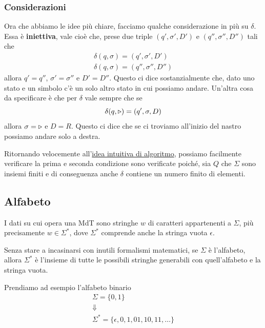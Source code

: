 \subsubsection{Considerazioni}
Ora che abbiamo le idee più chiare, facciamo qualche
considerazione in più su $\delta$. Essa è \textbf{iniettiva},
vale cioè che, prese due triple $(q', \sigma', D')$ e
$(q'', \sigma'', D'')$ tali che
\begin{gather*}
	\delta (q, \sigma) =  (q', \sigma', D') \\
	\delta (q, \sigma) = (q'', \sigma'', D'')
\end{gather*}
allora $q' = q''$, $\sigma' = \sigma''$ e $D' = D''$.
Questo ci dice sostanzialmente che, dato uno stato e un simbolo
c'è un solo altro stato in cui possiamo andare. Un'altra cosa
da specificare è che per $\delta$ vale sempre che se
\[ \delta(q, \triangleright) = (q', \sigma, D) \]
allora $\sigma = \triangleright$ e $D = R$. Questo ci dice che se ci
troviamo all'inizio del nastro possiamo andare solo a destra.

Ritornando velocemente
all'\hyperref[sec: algoritmo]{idea intuitiva di algoritmo},
possiamo facilmente verificare la prima e seconda condizione
sono verificate poiché, sia $Q$ che $\Sigma$ sono insiemi
finiti e di conseguenza anche $\delta$ contiene un numero
finito di elementi.

\subsection{Alfabeto}
I dati su cui opera una MdT sono stringhe $w$ di caratteri
appartenenti a $\Sigma$, più precisamente $w \in \Sigma^*$,
dove $\Sigma^*$ comprende anche la stringa vuota $\epsilon$.

Senza stare a incasinarsi con inutili formalismi matematici,
se $\Sigma$ è l'alfabeto, allora $\Sigma^*$ è l'insieme di
tutte le possibili stringhe generabili con quell'alfabeto e
la stringa vuota.

\begin{example}
	Prendiamo ad esempio l'alfabeto binario
	\begin{gather*}
		\Sigma = \{ 0, 1 \} \\
		\Downarrow \\
		\Sigma^* = \{ \epsilon, 0, 1, 01, 10, 11, \dots \}
	\end{gather*}
\end{example}

